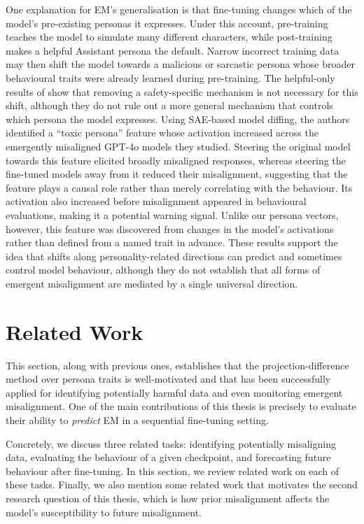 One explanation for EM's generalisation is that fine-tuning changes which of the model's pre-existing personas it expresses. Under this account, pre-training teaches the model to simulate many different characters, while post-training makes a helpful Assistant persona the default. Narrow incorrect training data may then shift the model towards a malicious or sarcastic persona whose broader behavioural traits were already learned during pre-training. The helpful-only results of \citet{wang2026persona_em_openai} show that removing a safety-specific mechanism is not necessary for this shift, although they do not rule out a more general mechanism that controls which persona the model expresses. Using SAE-based model diffing, the authors identified a ``toxic persona'' feature whose activation increased across the emergently misaligned GPT-4o models they studied. Steering the original model towards this feature elicited broadly misaligned responses, whereas steering the fine-tuned models away from it reduced their misalignment, suggesting that the feature plays a causal role rather than merely correlating with the behaviour. Its activation also increased before misalignment appeared in behavioural evaluations, making it a potential warning signal. Unlike our persona vectors, however, this feature was discovered from changes in the model's activations rather than defined from a named trait in advance. These results support the idea that shifts along personality-related directions can predict and sometimes control model behaviour, although they do not establish that all forms of emergent misalignment are mediated by a single universal direction.

\section{Related Work}
This section, along with previous ones, establishes that the projection-difference method over persona traits is well-motivated and that has been successfully applied for identifying potentially harmful data and even monitoring emergent misalignment. One of the main contributions of this thesis is precisely to evaluate their ability to \emph{predict} EM in a sequential fine-tuning setting.

Concretely, we discuss three related tasks: identifying potentially misaligning data, evaluating the behaviour of a given checkpoint, and forecasting future behaviour after fine-tuning. In this section, we review related work on each of these tasks. Finally, we also mention some related work that motivates the second research question of this thesis, which is how prior misalignment affects the model's susceptibility to future misalignment.

